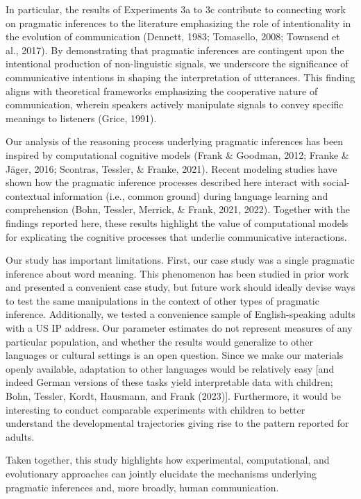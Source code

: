 \documentclass[
  man,floatsintext]{apa6}
\begin{document}
In particular, the results of Experiments 3a to 3c contribute to connecting work on pragmatic inferences to the literature emphasizing the role of intentionality in the evolution of communication (Dennett, 1983; Tomasello, 2008; Townsend et al., 2017). By demonstrating that pragmatic inferences are contingent upon the intentional production of non-linguistic signals, we underscore the significance of communicative intentions in shaping the interpretation of utterances. This finding aligns with theoretical frameworks emphasizing the cooperative nature of communication, wherein speakers actively manipulate signals to convey specific meanings to listeners (Grice, 1991).

Our analysis of the reasoning process underlying pragmatic inferences has been inspired by computational cognitive models (Frank \& Goodman, 2012; Franke \& Jäger, 2016; Scontras, Tessler, \& Franke, 2021). Recent modeling studies have shown how the pragmatic inference processes described here interact with social-contextual information (i.e., common ground) during language learning and comprehension (Bohn, Tessler, Merrick, \& Frank, 2021, 2022). Together with the findings reported here, these results highlight the value of computational models for explicating the cognitive processes that underlie communicative interactions.

Our study has important limitations. First, our case study was a single pragmatic inference about word meaning. This phenomenon has been studied in prior work and presented a convenient case study, but future work should ideally devise ways to test the same manipulations in the context of other types of pragmatic inference. Additionally, we tested a convenience sample of English-speaking adults with a US IP address. Our parameter estimates do not represent measures of any particular population, and whether the results would generalize to other languages or cultural settings is an open question. Since we make our materials openly available, adaptation to other languages would be relatively easy {[}and indeed German versions of these tasks yield interpretable data with children; Bohn, Tessler, Kordt, Hausmann, and Frank (2023){]}. Furthermore, it would be interesting to conduct comparable experiments with children to better understand the developmental trajectories giving rise to the pattern reported for adults.

Taken together, this study highlights how experimental, computational, and evolutionary approaches can jointly elucidate the mechanisms underlying pragmatic inferences and, more broadly, human communication.
\end{document}
